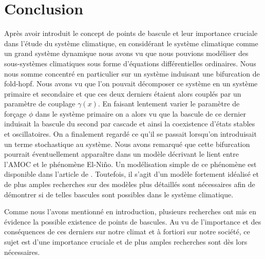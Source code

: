 \section{Conclusion}

Après avoir introduit le concept de points de bascule et leur importance cruciale dans l'étude du système climatique, en considérant le système climatique comme un grand système dynamique nous avons vu que nous pouvions modéliser des sous-systèmes climatiques sous forme d'équations différentielles ordinaires. Nous nous somme concentré en particulier sur un système induisant une bifurcation de fold-hopf. Nous avons vu que l'on pouvait décomposer ce système en un système primaire et secondaire et que ces deux derniers étaient alors couplés par un paramètre de couplage $\gamma(x)$. En faisant lentement varier le paramètre de forçage $\phi$ dans le système primaire on a alors vu que la bascule de ce dernier induisait la bascule du second par cascade et ainsi la coexistence d'états stables et oscillatoires. On a finalement regardé ce qu'il se passait lorsqu'on introduisait un terme stochastique au système. Nous avons remarqué que cette bifurcation pourrait éventuellement apparaître dans un modèle décrivant le lient entre l'AMOC et le phénomène El-Niño. Un modélisation simple de ce phénomène est disponible dans l'article de \cite{dekker_cascading_2018}. Toutefois, il s'agit d'un modèle fortement idéalisé et de plus amples recherches sur des modèles plus détaillés sont nécessaires afin de démontrer si de telles bascules sont possibles dans le système climatique.

Comme nous l'avons mentionné en introduction, plusieurs recherches ont mis en évidence la possible existence de points de bascules. Au vu de l'importance et des conséquences de ces derniers sur notre climat et à fortiori sur notre société, ce sujet est d'une importance cruciale et de plus amples recherches sont dès lors nécessaires.

